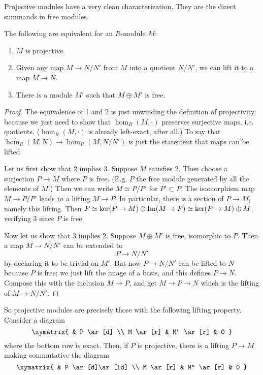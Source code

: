 Projective modules have a very clean characterization. They are the direct
summands in free modules. 

\begin{proposition} \label{projmod}
The following are equivalent for an $R$-module $M$:
\begin{enumerate}
\item $M$ is projective. 
\item Given any map $M \to N/N'$ from $M$ into a quotient $N/N'$, we can lift
it to a map $M \to N$. 
\item There is a module $M'$ such that $M \oplus M'$ is free.
\end{enumerate}
\end{proposition} 
\begin{proof} 
The equivalence of 1 and 2 is just unwinding the definition of projectivity,
because we just need to show that $\hom_R(M, \cdot)$ preserves surjective
maps, i.e. quotients.  ($\hom_R(M, \cdot)$ is already left-exact, after all.) 
To say that $\hom_R(M, N) \to \hom_R(M, N/N')$ is just the statement that maps
can be lifted.

Let us first show that 2 implies 3.  Suppose $M$ satisfies 2.  Then choose a
surjection $P \to M$ where $P$ is free. (E.g. $P$ the free module generated by
all the elements of $M$.)  
Then we can write $M \simeq P/P'$ for $P' \subset P$. The isomorphism map $M \to P/P'$
leads to a lifting $M \to P$.  In particular, there is a section of $P \to M$,
namely this lifting.  Then $P \simeq \ker(P \to M) \oplus \mathrm{Im}(M \to P) \simeq
\ker(P \to M) \oplus M$,
verifying 3 since $P$ is free.

Now let us show that 3 implies 2.  
Suppose $M \oplus M'$ is free, isomorphic to $P$. Then a map $M \to N/N'$ can
be extended to 
\[ P \to N/N'  \]
by declaring it to be trivial on $M'$.  But now $P \to N/N'$ can be lifted to
$N$ because $P$ is free; we just lift the image of a basis, and this defines $P
\to N$.  Compose this with the inclusion $M \to P$, and get $M \to P \to N$
which is the lifting of $M \to N/N'$. 
\end{proof} 

So projective modules are precisely those with the following lifting property.
Consider a diagram
\[ \xymatrix{
& P \ar[d] \\
M \ar[r] & M'' \ar[r] &  0
}\]
where the bottom row is exact. Then, if $P$ is projective, there is a lifting
$P \to M$ making commutative the diagram
\[ \xymatrix{
& P \ar[d]\ar[ld] \\
M \ar[r] & M'' \ar[r] &  0
}\]

